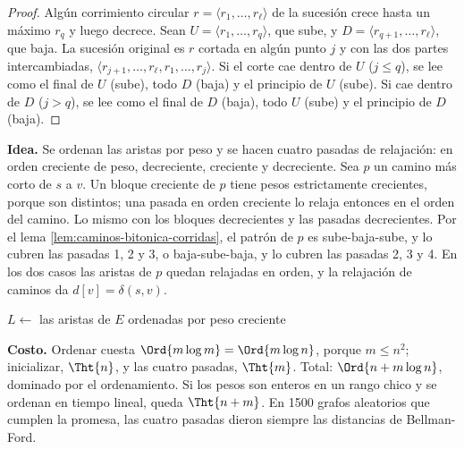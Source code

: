 \documentclass[11pt,letterpaper]{article}
\begin{document}
\begin{proof}
  Algún corrimiento circular $r = \langle r_1, \dots, r_\ell \rangle$
  de la sucesión crece hasta un máximo $r_q$ y luego decrece. Sean
  $U = \langle r_1, \dots, r_q \rangle$, que sube, y
  $D = \langle r_{q+1}, \dots, r_\ell \rangle$, que baja. La sucesión
  original es $r$ cortada en algún punto $j$ y con las dos partes
  intercambiadas, $\langle r_{j+1}, \dots, r_\ell, r_1, \dots, r_j
  \rangle$. Si el corte cae dentro de $U$ ($j \le q$), se lee como el
  final de $U$ (sube), todo $D$ (baja) y el principio de $U$ (sube).
  Si cae dentro de $D$ ($j > q$), se lee como el final de $D$ (baja),
  todo $U$ (sube) y el principio de $D$ (baja).
\end{proof}

\textbf{Idea.} Se ordenan las aristas por peso y se hacen cuatro
pasadas de relajación: en orden creciente de peso, decreciente,
creciente y decreciente. Sea $p$ un camino más corto de $s$ a $v$. Un
bloque creciente de $p$ tiene pesos estrictamente crecientes, porque
son distintos; una pasada en orden creciente lo relaja entonces en el
orden del camino. Lo mismo con los bloques decrecientes y las pasadas
decrecientes. Por el lema \ref{lem:caminos-bitonica-corridas}, el
patrón de $p$ es sube-baja-sube, y lo cubren las pasadas 1, 2 y 3, o
baja-sube-baja, y lo cubren las pasadas 2, 3 y 4. En los dos casos las
aristas de $p$ quedan relajadas en orden, y la relajación de caminos
da $d[v] = \delta(s, v)$.

\begin{algorithm}[H]
\caption{\textsc{Caminos-Bitónicos}$(G, w, s)$}
\label{alg:caminos-bitonicos}
\begin{algorithmic}[1]
  \State $L \gets$ las aristas de $E$ ordenadas por peso creciente
  \State {}
      \State {}
    \EndFor
  \EndFor
\EndProcedure
\end{algorithmic}
\end{algorithm}

\textbf{Costo.} Ordenar cuesta $\Ord{m \log m} = \Ord{m \log n}$,
porque $m \le n^2$; inicializar, $\Tht{n}$, y las cuatro pasadas,
$\Tht{m}$. Total: $\Ord{n + m \log n}$, dominado por el
ordenamiento. Si los pesos son enteros en un rango chico y se ordenan
en tiempo lineal, queda $\Tht{n + m}$. En 1500 grafos aleatorios que
cumplen la promesa, las cuatro pasadas dieron siempre las distancias
de Bellman-Ford.
\end{document}
